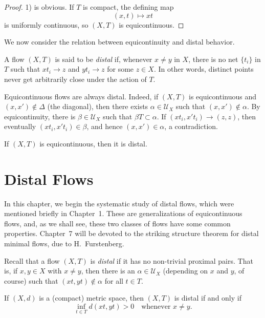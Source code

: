 \begin{proof}
    1) is obvious. If $T$ is compact, the defining map
    \[
        (x,t) \mapsto xt
    \]
    is uniformly continuous, so $(X,T)$ is equicontinuous.

\end{proof}


We now consider the relation between equicontinuity and distal behavior.

\begin{definition}
    A flow $(X,T)$ is said to be \emph{distal} if, whenever $x \neq y$ in $X$, there is no net $\{t_i\}$ in $T$ such that $xt_i \to z$ and $yt_i \to z$ for some $z \in X$. In other words, distinct points never get arbitrarily close under the action of $T$.
\end{definition}

Equicontinuous flows are always distal. Indeed, if $(X,T)$ is equicontinuous and $(x,x') \notin \Delta$ (the diagonal), then there exists $\alpha \in \mathcal{U}_X$ such that $(x,x') \notin \alpha$. By equicontinuity, there is $\beta \in \mathcal{U}_X$ such that $\beta T \subset \alpha$. If $(xt_i, x't_i) \to (z,z)$, then eventually $(xt_i, x't_i) \in \beta$, and hence $(x,x') \in \alpha$, a contradiction.



\begin{proposition}
    If $(X,T)$ is equicontinuous, then it is distal.
\end{proposition}




\section{Distal Flows}




In this chapter, we begin the systematic study of distal flows, which were mentioned briefly in Chapter~1. These are generalizations of equicontinuous flows, and, as we shall see, these two classes of flows have some common properties. Chapter~7 will be devoted to the striking structure theorem for distal minimal flows, due to H.~Furstenberg.

Recall that a flow $(X, T)$ is \emph{distal} if it has no non-trivial proximal pairs. That is, if $x, y \in X$ with $x \ne y$, then there is an $\alpha \in \mathcal{U}_X$ (depending on $x$ and $y$, of course) such that $(xt, yt) \notin \alpha$ for all $t \in T$.

If $(X, d)$ is a (compact) metric space, then $(X, T)$ is distal if and only if
\[
    \inf_{t \in T} d(xt, yt) > 0 \quad \text{whenever } x \ne y.
\]

